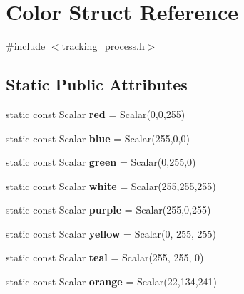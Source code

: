 \hypertarget{struct_color}{}\section{Color Struct Reference}
\label{struct_color}


{\ttfamily \#include $<$tracking\+\_\+process.\+h$>$}

\subsection*{Static Public Attributes}
\begin{DoxyCompactItemize}
\item 
static const Scalar {\bfseries red} = Scalar(0,0,255)\hypertarget{struct_color_a3a719c8fa99595a064873ff3735b191e}{}\label{struct_color_a3a719c8fa99595a064873ff3735b191e}

\item 
static const Scalar {\bfseries blue} = Scalar(255,0,0)\hypertarget{struct_color_ad65c713a1bfaa62c7c222379cd9591c9}{}\label{struct_color_ad65c713a1bfaa62c7c222379cd9591c9}

\item 
static const Scalar {\bfseries green} = Scalar(0,255,0)\hypertarget{struct_color_a748ac4a0b884a70627083dc7c03318f5}{}\label{struct_color_a748ac4a0b884a70627083dc7c03318f5}

\item 
static const Scalar {\bfseries white} = Scalar(255,255,255)\hypertarget{struct_color_acc387213feb8880e8fa61c306f6788ae}{}\label{struct_color_acc387213feb8880e8fa61c306f6788ae}

\item 
static const Scalar {\bfseries purple} = Scalar(255,0,255)\hypertarget{struct_color_aa1490dd2cb61e17be61287c61bb41cb7}{}\label{struct_color_aa1490dd2cb61e17be61287c61bb41cb7}

\item 
static const Scalar {\bfseries yellow} = Scalar(0, 255, 255)\hypertarget{struct_color_a2280055de8d620e851a81f6e2603b5ad}{}\label{struct_color_a2280055de8d620e851a81f6e2603b5ad}

\item 
static const Scalar {\bfseries teal} = Scalar(255, 255, 0)\hypertarget{struct_color_aaf469a242ca8e42847a9886f90d498b6}{}\label{struct_color_aaf469a242ca8e42847a9886f90d498b6}

\item 
static const Scalar {\bfseries orange} = Scalar(22,134,241)\hypertarget{struct_color_ad6a2ba9ca4e4fec8c23a5263abe2b8f7}{}\label{struct_color_ad6a2ba9ca4e4fec8c23a5263abe2b8f7}

\end{DoxyCompactItemize}


